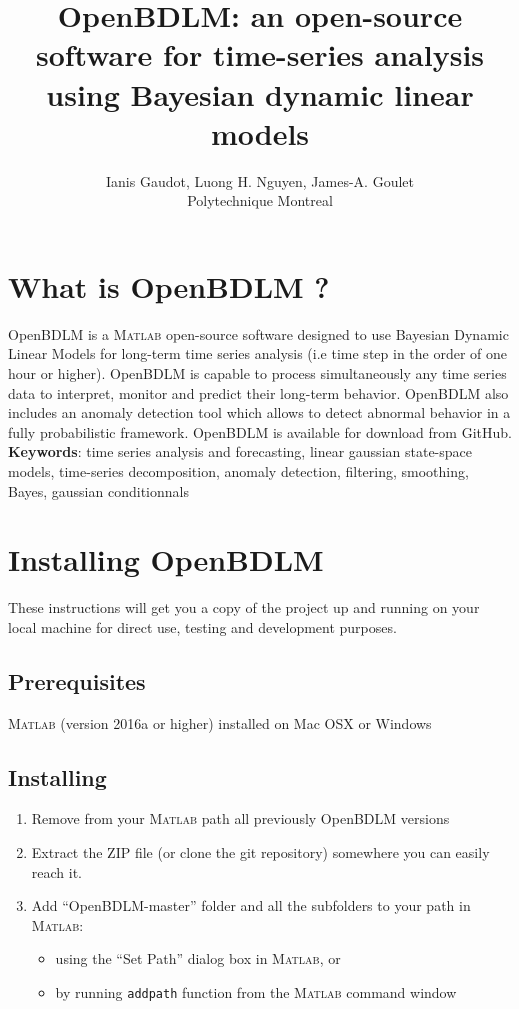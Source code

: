 \documentclass{article}
\title{OpenBDLM: an open-source \MATLAB{} software for time-series analysis using Bayesian dynamic linear models}
\author{Ianis Gaudot, Luong H. Nguyen, James-A. Goulet \\ Polytechnique Montreal}
\begin{document}
\newcommand{\MATLAB}{\textsc{Matlab}}


\maketitle

\tableofcontents

\newpage
\section{What is OpenBDLM ?}

OpenBDLM is a \MATLAB{} open-source software designed to use Bayesian Dynamic Linear Models for long-term time series analysis (i.e time step in the order of one hour or higher).
OpenBDLM is capable to process simultaneously any time series data to interpret, monitor and predict their long-term behavior.
OpenBDLM also includes an anomaly detection tool which allows to detect abnormal behavior in a fully probabilistic framework.
OpenBDLM is available for download from GitHub.\\ %

\textbf{Keywords}: time series analysis and forecasting, linear gaussian state-space models, time-series decomposition, anomaly detection, filtering, smoothing, Bayes, gaussian conditionnals

\newpage

\section{Installing OpenBDLM}

These instructions will get you a copy of the project up and running on your local machine for direct use, testing and development purposes.\\
\subsection{Prerequisites}
\MATLAB{} (version 2016a or higher) installed on Mac OSX or Windows\\

\subsection{Installing}
\begin{enumerate}
\item Remove from your \MATLAB{} path all previously OpenBDLM versions
\item Extract the ZIP file (or clone the git repository) somewhere you can easily reach it.
\item Add ``OpenBDLM-master'' folder and all the subfolders to your path in \MATLAB :
\begin{itemize}
    \item using the ``Set Path'' dialog box in \MATLAB{}, or 
    \item by running  \lstinline[basicstyle = \mlttfamily \small, backgroundcolor = \color{light-gray}]!addpath! function from the \MATLAB{} command window
    \end{itemize}
\end{enumerate}
\end{document}
